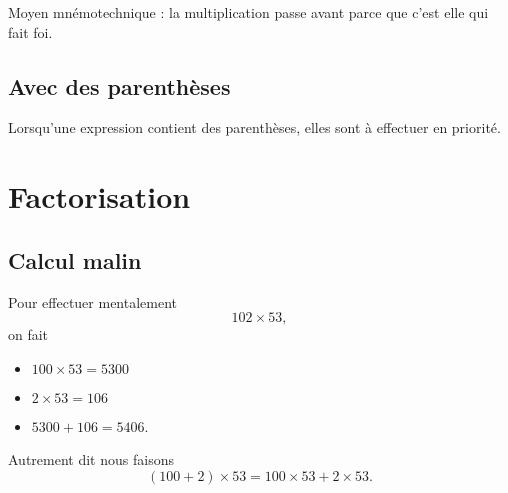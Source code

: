 Moyen mnémotechnique : la multiplication passe avant parce que c'est elle qui fait foi.

\subsection{Avec des parenthèses}

\begin{Aretenir}
    Lorsqu'une expression contient des parenthèses, elles sont à effectuer en priorité.
\end{Aretenir}

\section{Factorisation}



\subsection{Calcul malin}

Pour effectuer mentalement
\begin{equation}
    102\times 53,
\end{equation}
on fait
\begin{itemize}
    \item \( 100\times 53=5300\)
    \item \( 2\times 53=106\)
    \item \( 5300+106=5406\).
\end{itemize}
Autrement dit nous faisons
\begin{equation}
    (100+2)\times 53=100\times 53+2\times 53.
\end{equation}

